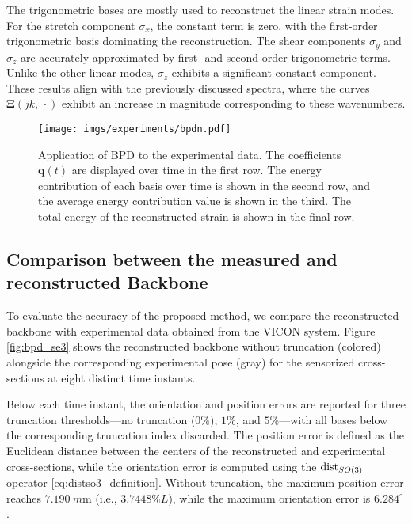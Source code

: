 The trigonometric bases are mostly used to reconstruct the linear strain modes. 
For the stretch component $\sigma_x$, the constant term is zero, with the first-order trigonometric basis dominating the reconstruction. The shear components $\sigma_y$ and $\sigma_z$ are accurately approximated by first- and second-order trigonometric terms. Unlike the other linear modes, $\sigma_z$ exhibits a significant constant component.
These results align with the previously discussed spectra, where the curves $\bm{\Xi}(jk, \, \cdot)$ exhibit an increase in magnitude corresponding to these wavenumbers.

%     
\begin{figure*}
    \centering
    \texttt{[image: imgs/experiments/bpdn.pdf]}
    \caption{Application of \ac{BPD} to the experimental data. The coefficients $\bm{q}(t)$ are displayed over time in the first row. The energy contribution of each basis over time is shown in the second row, and the average energy contribution value is shown in the third. The total energy of the reconstructed strain is shown in the final row.}
    \label{fig:bpd_q}
\end{figure*}

\subsection{Comparison between the measured and reconstructed Backbone}
To evaluate the accuracy of the proposed method, we compare the reconstructed backbone with experimental data obtained from the VICON system. Figure \ref{fig:bpd_se3} shows the reconstructed backbone without truncation (colored) alongside the corresponding experimental pose (gray) for the sensorized cross-sections at eight distinct time instants.

Below each time instant, the orientation and position errors are reported for three truncation thresholds—no truncation ($0\%$), $1\%$, and $5\%$—with all bases below the corresponding truncation index discarded.
The position error is defined as the Euclidean distance between the centers of the reconstructed and experimental cross-sections, while the orientation error is computed using the $\textnormal{dist}_{SO(3)}$ operator \eqref{eq:distso3_definition}. Without truncation, the maximum position error reaches $\SI{7.190}{m\meter}$ (i.e., $3.7448 \% L$), while the maximum orientation error is $6.284^{\circ}$.

